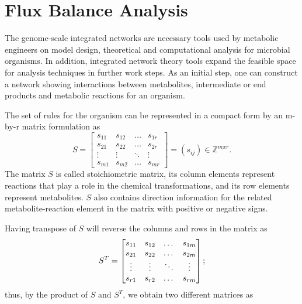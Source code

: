 \section{Flux Balance Analysis}
The genome-scale integrated networks are necessary tools used by metabolic engineers on model design, theoretical and computational analysis for microbial organisms. In addition, integrated network theory tools expand the feasible space for analysis techniques in further work steps. As an initial step, one can construct a network showing interactions between metabolites, intermediate or end products and metabolic reactions for an organism. 

The set of rules for the organism can be represented in a compact form by an m-by-r matrix formulation as
\begin{equation} \tag{1}
	S =  \begin{bmatrix} 
		s_{11} & s_{12} & \dots  & s_{1r}\\
		s_{21} & s_{22} & \dots  & s_{2r}\\
		\vdots & \vdots &\ddots & \vdots \\
		s_{m1} & s_{m2} & \dots & s_{mr} 
	\end{bmatrix}=(s_{ij})\in \mathbb{Z}^{mxr}.
	\label{stoichio}
\end{equation}
The matrix $S$ is called stoichiometric matrix, its column elements represent reactions that play a role in the chemical transformations, and its row elements represent metabolites. $S$ also contains direction information for the related metabolite-reaction element in the matrix with positive or negative signs.~\cite{klipp2005systems} 

Having transpose of $S$ will reverse the columns and rows in the matrix as 
\begin{equation}
	S^{T} =  \begin{bmatrix} 
		s_{11} & s_{12} & \dots  & s_{1m}\\
		s_{21} & s_{22} & \dots  & s_{2m}\\
		\vdots & \vdots &\ddots & \vdots \\
		s_{r1} & s_{r2} & \dots & s_{rm} 
	\end{bmatrix};
	\notag
\end{equation}
thus, by the product of $S$ and $S^{T}$, we obtain two different matrices as

